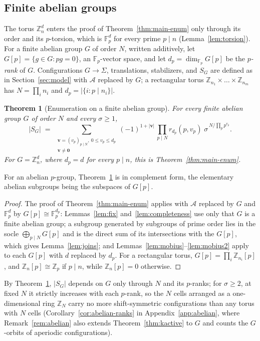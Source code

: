 \documentclass[11pt,a4paper]{article}
\newtheorem{theorem}{Theorem}[section]
\theoremstyle{remark}
\newcommand{\ZZ}{\mathbb{Z}}
\newcommand{\FF}{\mathbb{F}}
\newcommand{\A}{\mathcal{A}}
\newcommand{\vv}{\mathbf{v}}
\begin{document}
\subsection{Finite abelian groups}\label{sec:abelian}

The torus $\ZZ_n^d$ enters the proof of Theorem~\ref{thm:main-enum} only through its order
and its $p$-torsion, which is $\FF_p^d$ for every prime $p\mid n$
(Lemma~\ref{lem:torsion}). For a finite abelian group $G$ of order $N$,
written additively, let $G[p]=\{g\in G: pg=0\}$, an $\FF_p$-vector space, and
let $d_p=\dim_{\FF_p}G[p]$ be the \emph{$p$-rank} of $G$. Configurations
$G\to\Sigma$, translations, stabilizers, and $S_G$ are defined as in
Section~\ref{sec:model} with $\A$ replaced by $G$; a rectangular torus
$\ZZ_{n_1}\times\dots\times\ZZ_{n_m}$ has $N=\prod_i n_i$ and
$d_p=|\{i:p\mid n_i\}|$.

\begin{theorem}[Enumeration on a finite abelian group]\label{thm:abelian}
For every finite abelian group $G$ of order $N$ and every $\sigma\ge1$,
\[
  |S_G| \;=\; \sum_{\substack{\vv=(v_p)_{p\mid N},\ 0\le v_p\le d_p\\
  \vv\neq\mathbf 0}} (-1)^{1+|\vv|}\,\prod_{p\mid N} r_{d_p}(p,v_p)\;
  \sigma^{\,N/\prod_p p^{v_p}} .
\]
For $G=\ZZ_n^d$, where $d_p=d$ for every $p\mid n$, this is
Theorem~\ref{thm:main-enum}.
\end{theorem}
For an abelian $p$-group, Theorem~\ref{thm:abelian} is \cite[Lemma~7(iii)]{cg2017} in complement form,
the elementary abelian subgroups being the subspaces of $G[p]$.

\begin{proof}
The proof of Theorem~\ref{thm:main-enum} applies with $\A$ replaced by $G$
and $\FF_p^d$ by $G[p]\cong\FF_p^{d_p}$: Lemmas~\ref{lem:fix}
and~\ref{lem:completeness} use only that $G$ is a finite abelian group; a
subgroup generated by subgroups of prime order lies in the socle
$\bigoplus_{p\mid N}G[p]$ and is the direct sum of its intersections with
the $G[p]$, which gives Lemma~\ref{lem:joins}; and
Lemmas~\ref{lem:mobius}--\ref{lem:mobius2} apply to each $G[p]$ with $d$
replaced by $d_p$. For a rectangular torus,
$G[p]=\prod_i\ZZ_{n_i}[p]$, and $\ZZ_n[p]\cong\ZZ_p$ if $p\mid n$, while
$\ZZ_n[p]=0$ otherwise.
\end{proof}

By Theorem~\ref{thm:abelian}, $|S_G|$ depends on $G$ only through $N$ and its $p$-ranks; for
$\sigma\ge2$, at fixed $N$ it strictly increases with each $p$-rank, so the $N$ cells arranged as a
one-dimensional ring $\ZZ_N$ carry no more shift-symmetric configurations than any torus with $N$ cells
(Corollary~\ref{cor:abelian-ranks} in Appendix~\ref{app:abelian}, where Remark~\ref{rem:abelian} also extends
Theorem~\ref{thm:kactive} to $G$ and counts the $G$-orbits of aperiodic configurations).
\end{document}
